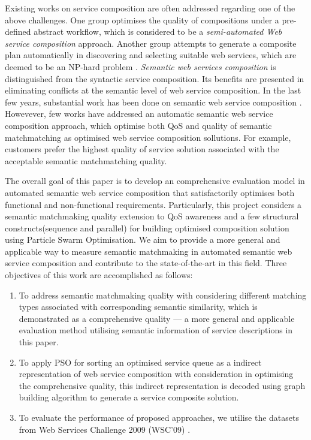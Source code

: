 \documentclass{llncs}
\begin{document}
Existing works on service composition are often addressed regarding one of the above challenges. One group optimises the quality of compositions under a pre-defined abstract workflow, which is considered to be a \textit{semi-automated Web service composition} approach. Another group attempts to generate a composite plan automatically in discovering and selecting suitable web services, which are deemed to be an NP-hard problem \cite{moghaddam2014service}. \textit{Semantic web services composition} is distinguished from the syntactic service composition. Its benefits are presented in eliminating conflicts at the semantic level of web service composition. In the last few years, substantial work has been done on semantic web service composition \cite{fensel2011semantic,lecue2009optimizing}. Howevever, few works have addressed an automatic semantic web service composition approach, which optimise both QoS and quality of semantic matchmatching as optimised web service composition sollutions. For example, customers prefer the highest quality of service solution associated with the acceptable semantic matchmatching quality.

The overall goal of this paper is to develop an comprehensive evaluation model in  automated semantic web service composition that satisfactorily optimises both functional and non-functional requirements. Particularly, this project considers a semantic matchmaking quality extension to QoS awareness and a few structural constructs(sequence and parallel) for building optimised composition solution using Particle Swarm Optimisation. We aim to provide a more general and applicable way to measure semantic matchmaking in automated semantic web service composition and contribute to the state-of-the-art in this field. Three objectives of this work are accomplished as follows:

\begin{enumerate}
 \item To address semantic matchmaking quality with considering different matching types associated with corresponding semantic similarity, which is demonstrated as a comprehensive quality --- a more general and applicable evaluation method utilising semantic information of service descriptions in this paper.
 
 \item To apply PSO for sorting an optimised service queue as a indirect representation of web service composition with consideration in optimising the comprehensive quality, this indirect representation is decoded using graph building algorithm to generate a service composite solution.
  
 \item To evaluate the performance of proposed approaches, we utilise the datasets from Web Services Challenge 2009 (WSC'09) \cite{kona2009wsc}.
\end{enumerate}
\end{document}
